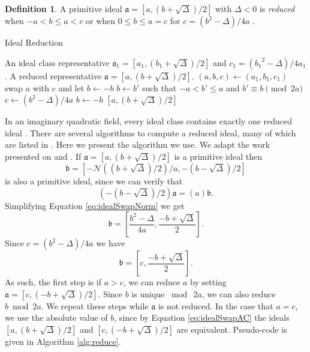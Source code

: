 \documentclass{ucalgthes1}
\theoremstyle{definition}
\newtheorem{defn}[thm]{Definition}
\begin{document}
\begin{defn}
\label{defn:reducedIdeal}
A primitive ideal $\mathfrak{a} = [a, (b+\sqrt{\Delta})/2]$ with $\Delta < 0$ is \emph{reduced} when $-a < b \le a < c$ or when $0 \le b \le a = c$ for $c = (b^2 - \Delta)/4a$ \cite[p.241]{Crandall2001}.
\end{defn}

\begin{algorithm}[h]
\caption{Ideal Reduction}
\label{alg:reduce}
\begin{algorithmic}[1]
\REQUIRE An ideal class representative $\mathfrak a_1 = [a_1, (b_1+\sqrt\Delta)/2]$ and $c_1 = ({b_1}^2 - \Delta)/4a_1$.
\ENSURE A reduced representative $\mathfrak a = [a, (b+\sqrt\Delta)/2]$.
\STATE $(a, b, c) \gets (a_1, b_1, c_1)$
		\STATE swap $a$ with $c$ and let $b \gets -b$
	\ENDIF
		\STATE $b \gets b'$ such that $-a < b' \le a$ and $b' \equiv b \pmod{2a}$
		\STATE $c \gets (b^2-\Delta)/4a$
	\ENDIF
\ENDWHILE
{}
	\STATE $b \gets -b$
\ENDIF
\RETURN $[a, (b+\sqrt\Delta)/2]$
\end{algorithmic}
\end{algorithm}

In an imaginary quadratic field, every ideal class contains exactly one reduced ideal \cite[p.20]{Ramachandran2006}.  There are several algorithms to compute a reduced ideal, many of which are listed in \cite{Jacobson2006}.  Here we present the algorithm we use.  We adapt the work presented on \cite[p.90]{Jacobson2006} and \cite[p.99]{Jacobson2009}. If $\mathfrak a = [a, (b + \sqrt\Delta)/2]$ is a primitive ideal then 
\begin{equation}
\label{eq:idealSwapNorm}
	\mathfrak b = \left[ -\mathcal N((b + \sqrt\Delta)/2)/a, -(b - \sqrt\Delta)/2 \right]
\end{equation}
is also a primitive ideal, since we can verify that
\[
	\left(-(b - \sqrt\Delta)/2 \right) \mathfrak a = (a) \mathfrak b.
\]
Simplifying Equation \ref{eq:idealSwapNorm} we get
\[
	\mathfrak b = \left[ \frac{b^2-\Delta}{4a}, \frac{-b + \sqrt\Delta}{2} \right].
\]
Since $c = (b^2 - \Delta)/4a$ we have
\begin{equation}
\label{eq:idealSwapAC}
	\mathfrak b = \left[ c, \frac{-b + \sqrt\Delta}{2} \right].
\end{equation}
As such, the first step is if $a > c$, we can reduce $a$ by setting $\mathfrak a = [c, (-b + \sqrt\Delta)/2]$.  Since $b$ is unique $\bmod{~2a}$, we can also reduce $b \bmod{2a}$.  We repeat these steps while $\mathfrak a$ is not reduced.  In the case that $a = c$, we use the absolute value of $b$, since by Equation \ref{eq:idealSwapAC} the ideals $[a, (b + \sqrt\Delta)/2]$ and $[c, (-b+\sqrt\Delta)/2]$ are equivalent.  Pseudo-code is given in Algorithm \ref{alg:reduce}.
\end{document}
